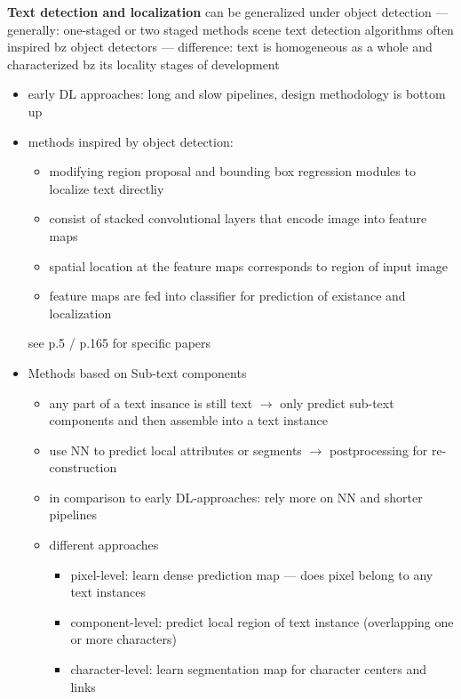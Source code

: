 \textbf{Text detection and localization}
can be generalized under object detection --- generally: one-staged or two staged methods
scene text detection algorithms often inspired bz object detectors --- difference:
        text is homogeneous as a whole and characterized bz its locality
stages of development
\begin{itemize}
    \item early DL approaches: long and slow pipelines, design methodology is bottom up
    \item methods inspired by object detection:
        \begin{itemize}
            \item modifying region proposal and bounding box regression modules to localize text
                directliy
            \item consist of stacked convolutional layers that encode image into feature maps
            \item spatial location at the feature maps corresponds to region of input image
            \item feature maps are fed into classifier for prediction of existance and localization
        \end{itemize}
        see p.5 / p.165 for specific papers
    \item Methods based on Sub-text components
        \begin{itemize}
            \item any part of a text insance is still text
                $\rightarrow$ only predict sub-text components and then assemble into a text instance
            \item use NN to predict local attributes or segments $\rightarrow$ postprocessing for
                re-construction
            \item in comparison to early DL-approaches: rely more on NN and shorter pipelines
            \item different approaches
                \begin{itemize}
                    \item pixel-level: learn dense prediction map --- does pixel belong to
                        any text instances
                    \item component-level: predict local region of text instance (overlapping one or
                        more characters)
                    \item character-level: learn segmentation map for character centers and links

\end{itemize}
\end{itemize}
\end{itemize}
